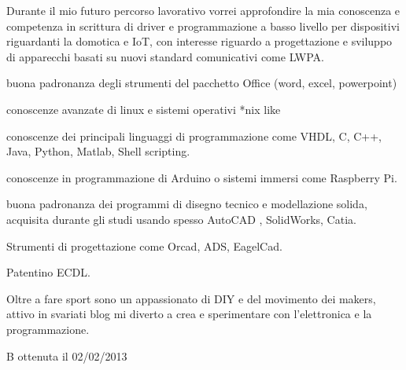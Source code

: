 \documentclass[italian,a4paper]{europasscv}
\begin{document}
\begin{europasscv}
		 {
		\begin{ecvitemize}
			\item Durante il mio futuro percorso lavorativo vorrei approfondire
				la mia conoscenza e competenza in scrittura di driver e
				programmazione a basso livello per dispositivi riguardanti la
				domotica e IoT, con interesse riguardo a progettazione e
				sviluppo di apparecchi basati su nuovi standard comunicativi
				come LWPA.
		\end{ecvitemize}
		}

		 {
			\begin{ecvitemize}
				\item buona padronanza degli strumenti del pacchetto Office
					(word, excel, powerpoint)
				\item conoscenze avanzate di linux e sistemi operativi *nix like
				\item conoscenze dei principali linguaggi di programmazione
					come VHDL, C, C++, Java, Python, Matlab, Shell scripting.
				\item conoscenze in programmazione di Arduino o sistemi immersi
					come Raspberry Pi.
				\item buona padronanza dei programmi di disegno tecnico e
					modellazione solida, acquisita durante gli studi usando
					spesso AutoCAD , SolidWorks, Catia.
				\item Strumenti di progettazione come Orcad, ADS, EagelCad.
				\item Patentino ECDL.
			\end{ecvitemize}
		}

		 {
			Oltre a fare sport sono un appassionato di DIY e del movimento dei
			makers, attivo in svariati blog mi diverto a crea e sperimentare con
			l'elettronica e la programmazione.
		}

		 {
			B ottenuta il 02/02/2013
		}
	\end{europasscv}
\end{document}
